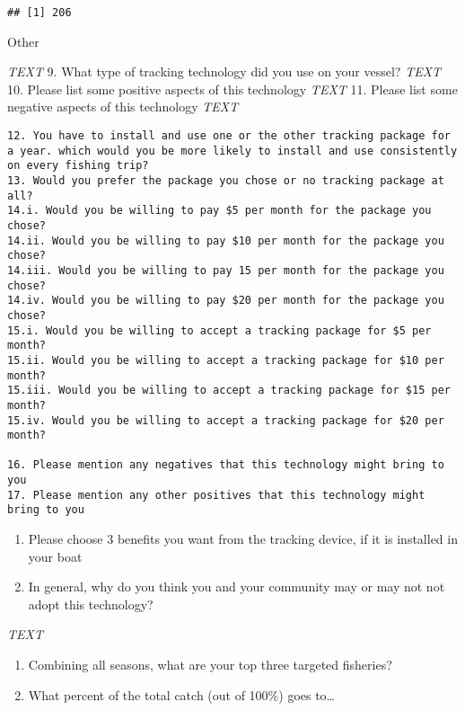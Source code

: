 \documentclass[]{article}
\begin{document}
\begin{verbatim}
## [1] 206
\end{verbatim}

Other

\emph{TEXT} 9. What type of tracking technology did you use on your
vessel? \emph{TEXT} 10. Please list some positive aspects of this
technology \emph{TEXT} 11. Please list some negative aspects of this
technology \emph{TEXT}

\begin{verbatim}
12. You have to install and use one or the other tracking package for a year. which would you be more likely to install and use consistently on every fishing trip?
13. Would you prefer the package you chose or no tracking package at all?
14.i. Would you be willing to pay $5 per month for the package you chose?
14.ii. Would you be willing to pay $10 per month for the package you chose?
14.iii. Would you be willing to pay 15 per month for the package you chose?
14.iv. Would you be willing to pay $20 per month for the package you chose?
15.i. Would you be willing to accept a tracking package for $5 per month?
15.ii. Would you be willing to accept a tracking package for $10 per month?
15.iii. Would you be willing to accept a tracking package for $15 per month?
15.iv. Would you be willing to accept a tracking package for $20 per month?

16. Please mention any negatives that this technology might bring to you
17. Please mention any other positives that this technology might bring to you
\end{verbatim}

\begin{enumerate}
\def\labelenumi{\arabic{enumi}.}
\setcounter{enumi}{17}
\item
  Please choose 3 benefits you want from the tracking device, if it is
  installed in your boat
\item
  In general, why do you think you and your community may or may not not
  adopt this technology?
\end{enumerate}

\emph{TEXT}

\begin{enumerate}
\def\labelenumi{\arabic{enumi}.}
\setcounter{enumi}{19}
\item
  Combining all seasons, what are your top three targeted fisheries?
\item
  What percent of the total catch (out of 100\%) goes to\ldots{}
\end{enumerate}
\end{document}
